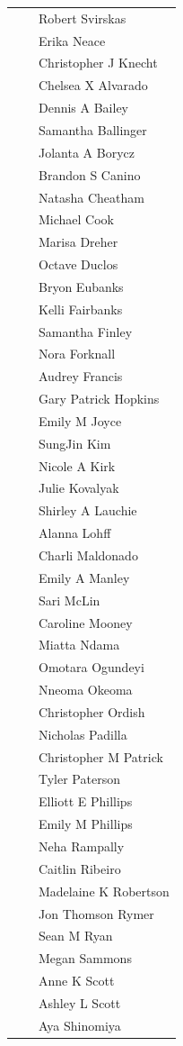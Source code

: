 \documentclass{article}
\begin{document}
\begin{center}
\begin{longtable}{lll}
 &  & Robert Svirskas \\
 &  & Erika Neace \\
 &  & Christopher J Knecht \\
 &  & Chelsea X Alvarado \\
 &  & Dennis A Bailey \\
 &  & Samantha Ballinger \\
 &  & Jolanta A Borycz \\
 &  & Brandon S Canino \\
 &  & Natasha Cheatham \\
 &  & Michael Cook \\
 &  & Marisa Dreher \\
 &  & Octave Duclos \\
 &  & Bryon Eubanks \\
 &  & Kelli Fairbanks \\
 &  & Samantha Finley \\
 &  & Nora Forknall \\
 &  & Audrey Francis \\
 &  & Gary Patrick Hopkins \\
 &  & Emily M Joyce \\
 &  & SungJin Kim \\
 &  & Nicole A Kirk \\
 &  & Julie Kovalyak \\
 &  & Shirley A Lauchie \\
 &  & Alanna Lohff \\
 &  & Charli Maldonado \\
 &  & Emily A Manley \\
 &  & Sari McLin \\
 &  & Caroline Mooney \\
 &  & Miatta Ndama \\
 &  & Omotara Ogundeyi \\
 &  & Nneoma Okeoma \\
 &  & Christopher Ordish \\
 &  & Nicholas Padilla \\
 &  & Christopher M Patrick \\
 &  & Tyler Paterson \\
 &  & Elliott E Phillips \\
 &  & Emily M Phillips \\
 &  & Neha Rampally \\
 &  & Caitlin Ribeiro \\
 &  & Madelaine K Robertson \\
 &  & Jon Thomson Rymer \\
 &  & Sean M Ryan \\
 &  & Megan Sammons \\
 &  & Anne K Scott \\
 &  & Ashley L Scott \\
 &  & Aya Shinomiya \\
\end{longtable}
\end{center}
\end{document}
